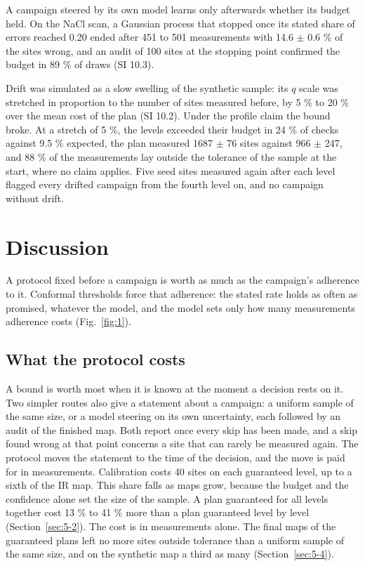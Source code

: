 \documentclass{iopjournal}
\begin{document}
A campaign steered by its own model learns only afterwards whether its budget held. On the NaCl scan, a Gaussian process that stopped once its stated share of errors reached 0.20 ended after 451 to 501 measurements with 14.6 \ensuremath{\pm} 0.6 \% of the sites wrong, and an audit of 100 sites at the stopping point confirmed the budget in 89 \% of draws (SI 10.3).

Drift was simulated as a slow swelling of the synthetic sample: its \(q\) scale was stretched in proportion to the number of sites measured before, by 5 \% to 20 \% over the mean cost of the plan (SI 10.2). Under the profile claim the bound broke. At a stretch of 5 \%, the levels exceeded their budget in 24 \% of checks against 9.5 \% expected, the plan measured 1687 \ensuremath{\pm} 76 sites against 966 \ensuremath{\pm} 247, and 88 \% of the measurements lay outside the tolerance of the sample at the start, where no claim applies. Five seed sites measured again after each level flagged every drifted campaign from the fourth level on, and no campaign without drift.

\hypertarget{sec:6}{%
\section{Discussion}\label{sec:6}}

A protocol fixed before a campaign is worth as much as the campaign's adherence to it. Conformal thresholds force that adherence: the stated rate holds as often as promised, whatever the model, and the model sets only how many measurements adherence costs (Fig.~\ref{fig:1}).

\hypertarget{what-the-protocol-costs}{%
\subsection{What the protocol costs}\label{what-the-protocol-costs}}

A bound is worth most when it is known at the moment a decision rests on it. Two simpler routes also give a statement about a campaign: a uniform sample of the same size, or a model steering on its own uncertainty, each followed by an audit of the finished map. Both report once every skip has been made, and a skip found wrong at that point concerns a site that can rarely be measured again. The protocol moves the statement to the time of the decision, and the move is paid for in measurements. Calibration costs 40 sites on each guaranteed level, up to a sixth of the IR map. This share falls as maps grow, because the budget and the confidence alone set the size of the sample. A plan guaranteed for all levels together cost 13 \% to 41 \% more than a plan guaranteed level by level (Section~\ref{sec:5-2}). The cost is in measurements alone. The final maps of the guaranteed plans left no more sites outside tolerance than a uniform sample of the same size, and on the synthetic map a third as many (Section~\ref{sec:5-4}).
\end{document}
